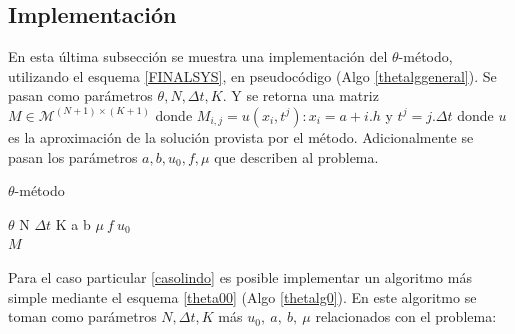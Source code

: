 \documentclass{endm}
\begin{document}
\subsection{Implementación}
En esta última subsección se muestra una implementación del $\theta$-método, utilizando el esquema \ref{FINALSYS}, en pseudocódigo (Algo \ref{thetalggeneral}). Se pasan como parámetros $\theta, N, \Delta t, K$. Y se retorna una matriz $ M \in \mathcal{M}^{(N+1)\times(K+1)}$ donde $M_{i,j}=u(x_i,t^j) : x_i=a+i.h$ y $t^j = j.\Delta t$ donde $u$ es la aproximación de la solución provista por el método. Adicionalmente se pasan los parámetros $a, b, u_0, f, \mu$ que describen al problema.
\begin{algorithm}[H]
\caption{$\theta$-método}
\label{thetalggeneral}
\small
\centering
\begin{algorithmic}[1] 
\Require $\theta$ N $\Delta t$ K a b $\mu \ f \ u_0$ 
        \EndFor
    \EndFor
        \EndFor
    \EndFor
    \EndFor
    \EndFor\\
\Return $M$ 
\end{algorithmic}
\end{algorithm}
Para el caso particular \ref{casolindo} es posible implementar un algoritmo más simple mediante el esquema \ref{theta00} (Algo \ref{thetalg0}). En este algoritmo se toman como parámetros $N, \Delta t, K$ más $u_0, \ a, \ b, \ \mu$ relacionados con el problema:
\end{document}
